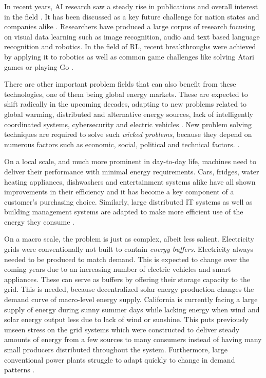 
In recent years, \ac{AI} research saw a steady rise in publications and overall interest in the field
\cite[]{arulkumaran2017brief, russell2016artificial}.
It has been discussed as a key future challenge for nation states and companies alike
\cite[]{mozur_markoff_2017, faznetchina_2018}. Researchers have produced a large corpus of research focusing on visual
data learning such as image recognition, audio and text based language recognition and robotics. In the field of
\ac{RL}, recent breakthroughs were achieved by applying it to robotics as well as common game challenges like solving Atari games or
playing Go
\cite[]{arulkumaran2017brief}.

There are other important problem fields that can also benefit from these technologies, one of them being global energy markets.
These are expected to shift radically in the upcoming decades, adapting to new problems related to global warming,
distributed and alternative energy sources, lack of intelligently coordinated systems, cybersecurity  and electric vehicles \cite[p.10ff.]{mitei2011}. New problem solving techniques are required to solve such \emph{wicked problems}, because
they depend on numerous factors such as economic, social, political and technical factors.
\cite[]{ketter2015competitive}.

On a local scale, and much more prominent in day-to-day life, machines need to deliver their performance with minimal energy requirements. Cars, fridges, water heating
appliances, dishwashers and entertainment systems alike have all shown improvements in their efficiency and it has
become a key component of a customer's purchasing choice.  Similarly, large distributed IT systems as well as building
management systems are adapted to make more efficient use of the energy they consume 
\cite[]{Orgerie:2014:STI:2597757.2532637, DePaola:2014:IMS:2620784.2611779}.

On a macro scale, the problem is just as complex, albeit less salient.  Electricity grids were conventionally not built
to contain \emph{energy buffers}. Electricity always needed to be produced to match demand. This is expected to change
over the coming years due to an increasing number of electric vehicles and smart appliances. These can serve as buffers
by offering their storage capacity to the grid. This is needed, because decentralized
solar energy production changes the demand curve of macro-level energy supply. California is currently facing a large
supply of energy during sunny summer days while lacking energy when wind and solar energy output less due to lack of
wind or sunshine. This puts previously unseen stress on the grid systems which were constructed to deliver steady amounts
of energy from a few sources to many consumers instead of having many small producers distributed throughout the system.
Furthermore, large conventional power plants struggle to adapt quickly to change in demand patterns
\cite[]{roberts_2016}.


